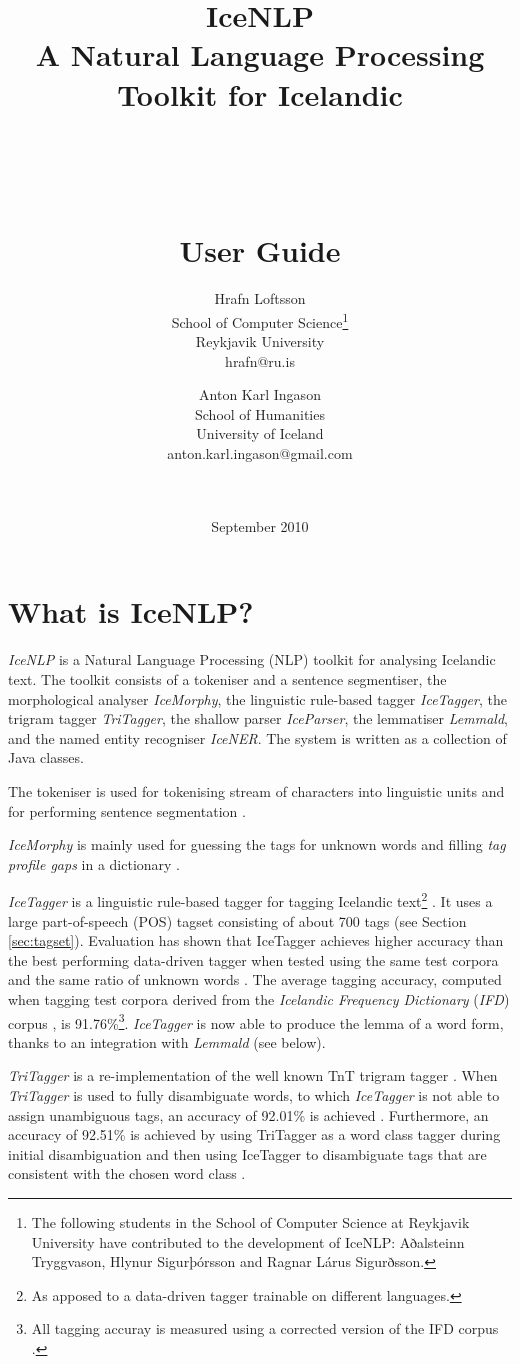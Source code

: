 \documentclass[11pt]{article}
\title{IceNLP \\
A Natural Language Processing Toolkit for Icelandic \\ \ \\ \ \\ \ \\
    User Guide}
\author{Hrafn Loftsson \\
        School of Computer Science\footnote{The following students in the School of Computer Science at Reykjavik University have contributed to the development of IceNLP: Aðalsteinn Tryggvason, Hlynur Sigurþórsson and Ragnar Lárus Sigurðsson.} \\
        Reykjavik University \\
        hrafn@ru.is 
\and
	Anton Karl Ingason \\
	School of Humanities \\
	University of Iceland \\
	anton.karl.ingason@gmail.com \\ \ \\ \ \\
}
\begin{document}
\label{firstpage}
\date{September 2010}
\maketitle
\newpage
\tableofcontents
\newpage

\section{What is IceNLP?}
\emph{IceNLP} is a Natural Language Processing (NLP) toolkit for analysing Icelandic text.
The toolkit consists of a tokeniser and a sentence segmentiser, the morphological analyser \emph{IceMorphy}, the linguistic rule-based tagger \emph{IceTagger}, the trigram tagger \emph{TriTagger}, the shallow parser \emph{IceParser}, the lemmatiser \emph{Lemmald}, and the named entity recogniser \emph{IceNER}.
The system is written as a collection of Java classes.

The tokeniser is used for tokenising stream of characters into linguistic units and for performing sentence segmentation \citep{pal00}.

\emph{IceMorphy} is mainly used for guessing the tags for unknown words and filling \emph{tag profile gaps} in a dictionary \citep{lof08}.

\emph{IceTagger} is a linguistic rule-based tagger for tagging Icelandic text\footnote{As apposed to a data-driven tagger trainable on different languages.} \citep{lof06,lof08}.
It uses a large part-of-speech (POS) tagset consisting of about 700 tags (see Section \ref{sec:tagset}).
Evaluation has shown that IceTagger achieves higher accuracy than the best performing data-driven tagger when tested using the same test corpora and the same ratio of unknown words \citep{lof08,hel04}.
The average tagging accuracy, computed when tagging test corpora derived from the \emph{Icelandic Frequency Dictionary} (\emph{IFD}) corpus \citep{pin91}, is 91.76\%\footnote{All tagging accuray is measured using a corrected version of the IFD corpus \citep{lof09}.}.
\emph{IceTagger} is now able to produce the lemma of a word form, thanks to an integration with \emph{Lemmald} (see below).

\emph{TriTagger} is a re-implementation of the well known TnT trigram tagger \citep{bra00}.
When \emph{TriTagger} is used to fully disambiguate words, to which \emph{IceTagger} is not able to assign unambiguous tags, an accuracy of 92.01\% is achieved \citep{lof06b,lof09b}.
Furthermore, an accuracy of 92.51\% is achieved by using TriTagger as a word class tagger during initial disambiguation and then using IceTagger to disambiguate tags that are consistent with the chosen word class \citep{lof09b}.
\end{document}
